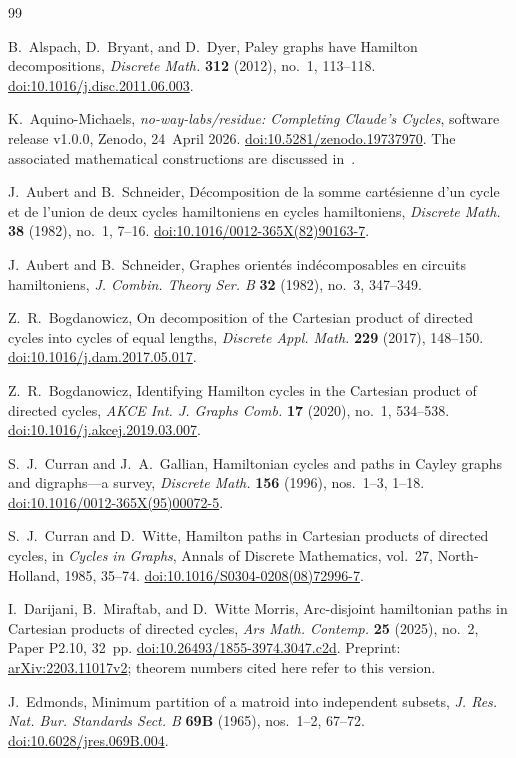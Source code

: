 \documentclass[11pt,reqno]{amsart}
\numberwithin{equation}{section}
\theoremstyle{definition}
\theoremstyle{remark}
\newcommand{\arxivref}[1]{\href{https://arxiv.org/abs/#1}{arXiv:#1}}
\newcommand{\doiref}[1]{\href{https://doi.org/#1}{doi:#1}}
\begin{document}
\begin{thebibliography}{99}

B.~Alspach, D.~Bryant, and D.~Dyer,
Paley graphs have Hamilton decompositions,
\emph{Discrete Math.} \textbf{312} (2012), no.~1, 113--118.
\doiref{10.1016/j.disc.2011.06.003}.

K.~Aquino-Michaels,
\emph{no-way-labs/residue: Completing Claude's Cycles},
software release v1.0.0, Zenodo, 24~April 2026.
\doiref{10.5281/zenodo.19737970}.
The associated mathematical constructions are discussed in~\cite{Knuth26}.

J.~Aubert and B.~Schneider,
D\'ecomposition de la somme cart\'esienne d'un cycle et de l'union de deux cycles
hamiltoniens en cycles hamiltoniens,
\emph{Discrete Math.} \textbf{38} (1982), no.~1, 7--16.
\doiref{10.1016/0012-365X(82)90163-7}.

J.~Aubert and B.~Schneider,
Graphes orient\'es ind\'ecomposables en circuits hamiltoniens,
\emph{J. Combin. Theory Ser. B} \textbf{32} (1982), no.~3, 347--349.

Z.~R.~Bogdanowicz,
On decomposition of the Cartesian product of directed cycles into cycles of equal lengths,
\emph{Discrete Appl. Math.} \textbf{229} (2017), 148--150.
\doiref{10.1016/j.dam.2017.05.017}.

Z.~R.~Bogdanowicz,
Identifying Hamilton cycles in the Cartesian product of directed cycles,
\emph{AKCE Int. J. Graphs Comb.} \textbf{17} (2020), no.~1, 534--538.
\doiref{10.1016/j.akcej.2019.03.007}.

S.~J.~Curran and J.~A.~Gallian,
Hamiltonian cycles and paths in Cayley graphs and digraphs---a survey,
\emph{Discrete Math.} \textbf{156} (1996), nos.~1--3, 1--18.
\doiref{10.1016/0012-365X(95)00072-5}.

S.~J.~Curran and D.~Witte,
Hamilton paths in Cartesian products of directed cycles,
in \emph{Cycles in Graphs}, Annals of Discrete Mathematics, vol.~27,
North-Holland, 1985, 35--74.
\doiref{10.1016/S0304-0208(08)72996-7}.

I.~Darijani, B.~Miraftab, and D.~Witte Morris,
Arc-disjoint hamiltonian paths in Cartesian products of directed cycles,
\emph{Ars Math. Contemp.} \textbf{25} (2025), no.~2, Paper P2.10, 32~pp.
\doiref{10.26493/1855-3974.3047.c2d}.
Preprint: \arxivref{2203.11017v2}; theorem numbers cited here refer to this version.

J.~Edmonds,
Minimum partition of a matroid into independent subsets,
\emph{J. Res. Nat. Bur. Standards Sect. B} \textbf{69B} (1965), nos.~1--2, 67--72.
\doiref{10.6028/jres.069B.004}.


\end{thebibliography}
\end{document}

